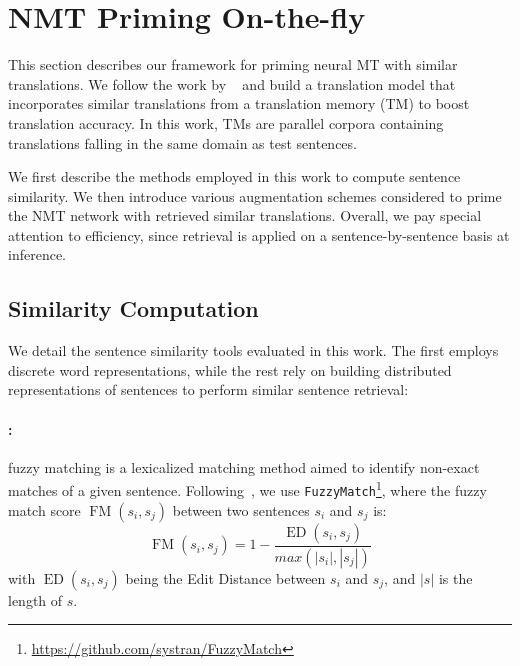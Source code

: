 \section{NMT Priming On-the-fly}
\label{sec:priming-chap8}

This section describes our framework for priming neural MT with similar translations. 
We follow the work by ~\cite{bulte19neural,xu20boosting} and build a translation model that incorporates similar translations from a translation memory (TM) to boost translation accuracy. In this work, TMs are parallel corpora containing translations falling in the same domain as test sentences.

We first describe the methods employed in this work to compute sentence similarity. We then introduce various augmentation schemes considered to prime the NMT network with retrieved similar translations. Overall, we pay special attention to efficiency, since retrieval is applied on a sentence-by-sentence basis at inference.

\subsection{Similarity Computation}
\label{ssec:sim-chap8}

We detail the sentence similarity tools evaluated in this work. The first employs discrete word representations, while the rest rely on building distributed representations of sentences to perform similar sentence retrieval:


\paragraph{:} fuzzy matching is a lexicalized matching method aimed to identify non-exact matches of a given sentence. Following~\citet{xu20boosting}, we use \texttt{FuzzyMatch}\footnote{\url{https://github.com/systran/FuzzyMatch}}, where the fuzzy match score $\operatorname{FM} (s_i,s_j)$ between two sentences $s_i$ and $s_j$ is:
    \begin{equation*}
    \operatorname{FM} (s_i,s_j) = 1 - \frac{\operatorname{ED} (s_i,s_j)}{max(|s_i|,|s_j|)}
    \label{eq:FM-chap8}
    \end{equation*}
    \noindent with $\operatorname{ED}(s_i,s_j)$ being the Edit Distance between $s_i$ and $s_j$, and $|s|$ is the length of $s$. 
